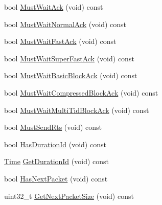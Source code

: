 \begin{DoxyCompactItemize}
\item 
bool \hyperlink{classns3_1_1MacLowTransmissionParameters_aa7d49e04e12fbc04d1d0fa4f256a0c88}{Must\+Wait\+Ack} (void) const 
\item 
bool \hyperlink{classns3_1_1MacLowTransmissionParameters_a39fb4df4ce039751fedc06e52af0f281}{Must\+Wait\+Normal\+Ack} (void) const 
\item 
bool \hyperlink{classns3_1_1MacLowTransmissionParameters_a556e680aab416b0de270d487f94e236f}{Must\+Wait\+Fast\+Ack} (void) const 
\item 
bool \hyperlink{classns3_1_1MacLowTransmissionParameters_a2e1f3f65427d04009a84e52168594a4b}{Must\+Wait\+Super\+Fast\+Ack} (void) const 
\item 
bool \hyperlink{classns3_1_1MacLowTransmissionParameters_aea99b66ee9ebcb0f4429bb98be411023}{Must\+Wait\+Basic\+Block\+Ack} (void) const 
\item 
bool \hyperlink{classns3_1_1MacLowTransmissionParameters_aac6b2115c70ccf5fa73e265855790a5d}{Must\+Wait\+Compressed\+Block\+Ack} (void) const 
\item 
bool \hyperlink{classns3_1_1MacLowTransmissionParameters_a36fbde1072b1532353a1f6d6d0d6efa1}{Must\+Wait\+Multi\+Tid\+Block\+Ack} (void) const 
\item 
bool \hyperlink{classns3_1_1MacLowTransmissionParameters_a84f6c50f9cbd717e5191e178ae05b331}{Must\+Send\+Rts} (void) const 
\item 
bool \hyperlink{classns3_1_1MacLowTransmissionParameters_a6579f7c9f95c2467fbf6ec7e1c954e88}{Has\+Duration\+Id} (void) const 
\item 
\hyperlink{classns3_1_1Time}{Time} \hyperlink{classns3_1_1MacLowTransmissionParameters_aeca7edbe326d741af92b8ce38bf5e1e1}{Get\+Duration\+Id} (void) const 
\item 
bool \hyperlink{classns3_1_1MacLowTransmissionParameters_aa77eff21861b910ba0e82cf642df6f5e}{Has\+Next\+Packet} (void) const 
\item 
uint32\+\_\+t \hyperlink{classns3_1_1MacLowTransmissionParameters_a2fa1d7ed585e00cc56a2968da9cef7dd}{Get\+Next\+Packet\+Size} (void) const 
\end{DoxyCompactItemize}
